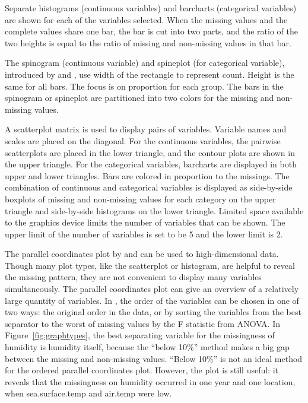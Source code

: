 \documentclass[article]{jss}
\begin{document}
Separate histograms (continuous variables) and barcharts (categorical variables) are shown for each of the variables selected. When the missing values and the complete values share one bar, the bar is cut into two parts, and the ratio of the two heights is equal to the ratio of missing and non-missing values in that bar.

The spinogram (continuous variable) and spineplot (for categorical variable), introduced by \citet{hummel1996linked} and \citet{theus1999visualizing}, use width of the rectangle to represent count. Height is the same for all bars. The focus is on proportion for each group. The bars in the spinogram or spineplot are partitioned into two colors for the missing and non-missing values.

A scatterplot matrix is used to display pairs of variables. Variable names and scales are placed on the diagonal. For the continuous variables, the pairwise scatterplots are placed in the lower triangle, and the contour plots are shown in the upper triangle. For the categorical variables, barcharts are displayed in both upper and lower triangles. Bars are colored in proportion to the missings. The combination of continuous and categorical variables is displayed as side-by-side boxplots of missing and non-missing values for each category on the upper triangle and side-by-side histograms on the lower triangle. Limited space available to the graphics device limits the number of variables that can be shown. The upper limit of the number of variables is set to be 5 and the lower limit is 2.

The parallel coordinates plot by \citet{inselberg1985plane} and \citet{wegman1990hyperdimensional} can be used to high-dimensional data. Though many plot types, like the scatterplot or histogram, are helpful to reveal the missing pattern, they are not convenient to display many variables simultaneously. The parallel coordinates plot can give an overview of a relatively large quantity of variables. In , the order of the variables can be chosen in one of two ways: the original order in the data, or by sorting the variables from the best separator to the worst of missing values by the F statistic from ANOVA. In Figure~\ref{fig:graphtypes}, the best separating variable for the missingness of humidity is humidity itself, because the ``below 10\%'' method makes a big gap between the missing and non-missing values. ``Below 10\%'' is not an ideal method for the ordered parallel coordinates plot. However, the plot is still useful: it reveals that the missingness on humidity occurred in one year and one location, when sea.surface.temp and air.temp were low.
\end{document}
